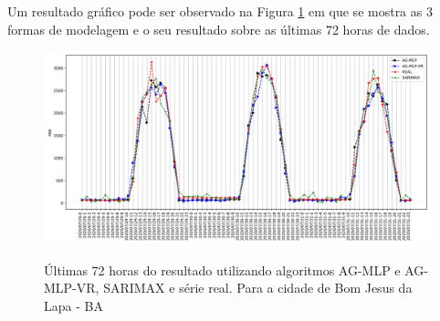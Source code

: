 Um resultado gráfico pode ser observado na Figura \ref{fig:cap4_bjl_3_days_hibrids} em que se mostra as 3 formas de modelagem e o seu resultado sobre as últimas 72 horas de dados.

\begin{figure}[!htbp]
    \centering
    \caption{Últimas 72 horas do resultado utilizando algoritmos AG-MLP e AG-MLP-VR, SARIMAX e série real. Para a cidade de Bom Jesus da Lapa - BA}
    \includegraphics[width=\textwidth]{Figuras/cap4/comparison_hibrids_bjl.png}
    \label{fig:cap4_bjl_3_days_hibrids}
\end{figure}